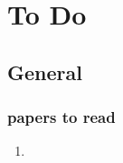 
\section{To Do}



\subsection*{General}
\subsubsection*{papers to read}
\begin{enumerate}
	\item 
\end{enumerate}
